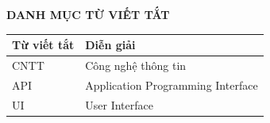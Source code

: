 \vspace*{15pt}
\begin{center}
\large{\textbf{DANH MỤC TỪ VIẾT TẮT}}
\end{center}


\begin{table}[H]
\centering
\renewcommand{\arraystretch}{1.3}
\begin{tabular}{|p{4cm}|p{9cm}|}
\hline
\textbf{Từ viết tắt} & \textbf{Diễn giải} \\
\hline
CNTT & Công nghệ thông tin \\
\hline
API & Application Programming Interface \\
\hline
UI & User Interface \\
\hline
\end{tabular}
\end{table}


